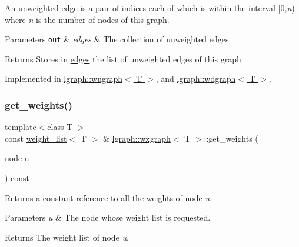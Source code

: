 An unweighted edge is a pair of indices each of which is within the interval \mbox{[}0,{\itshape n}) where {\itshape n} is the number of nodes of this graph.


\begin{DoxyParams}[1]{Parameters}
\mbox{\tt out}  & {\em edges} & The collection of unweighted edges. \\
\hline
\end{DoxyParams}
\begin{DoxyReturn}{Returns}
Stores in \hyperlink{classlgraph_1_1wxgraph_a1b89f56544185e33d54e72a8ed19a789}{edges} the list of unweighted edges of this graph. 
\end{DoxyReturn}


Implemented in \hyperlink{classlgraph_1_1wugraph_a455d1df8d3799b70a23b5b9944cbafb7}{lgraph\+::wugraph$<$ T $>$}, and \hyperlink{classlgraph_1_1wdgraph_a291ce640bc2273ab23d3d8a545476e7a}{lgraph\+::wdgraph$<$ T $>$}.

\mbox{\label{classlgraph_1_1wxgraph_a468406b24e0d61a96b7106b845c5c718}} 
\subsubsection{\texorpdfstring{get\+\_\+weights()}{get\_weights()}\hspace{0.1cm}{\footnotesize\ttfamily [1/2]}}
{\footnotesize\ttfamily template$<$class T $>$ \\
const \hyperlink{namespacelgraph_a1e0fd5ef0a78b2a92da48adbed265cb6}{weight\+\_\+list}$<$ T $>$ \& \hyperlink{classlgraph_1_1wxgraph}{lgraph\+::wxgraph}$<$ T $>$\+::get\+\_\+weights (\begin{DoxyParamCaption}\item[{\hyperlink{namespacelgraph_a397169dd66adf725210a30fb7251773e}{node}}]{u }\end{DoxyParamCaption}) const}



Returns a constant reference to all the weights of node {\itshape u}. 


\begin{DoxyParams}{Parameters}
{\em u} & The node whose weight list is requested. \\
\hline
\end{DoxyParams}
\begin{DoxyReturn}{Returns}
The weight list of node {\itshape u}. 
\end{DoxyReturn}
\mbox{\label{classlgraph_1_1wxgraph_a423a6e9eb99fd40d9aae73e7ff5adca9}} 
